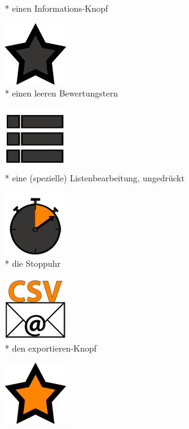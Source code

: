 \documentclass[FIPLY_base.tex]{subfiles}
\begin{document}
\begin{figure}[H]
\begin{subfigure}[b]{0.2\textwidth}
			\caption{* einen Informations-Knopf}
		\end{subfigure}
		\hfil
		\begin{subfigure}[b]{0.2\textwidth}
			\includegraphics[scale=0.4]{img/icons/star_emptysmall}
			\caption{* einen leeren Bewertungstern}
		\end{subfigure}
		\hfil
		\begin{subfigure}[b]{0.2\textwidth}
			\includegraphics[scale=0.4]{img/icons/listviewunpressed}
			\caption{* eine (spezielle) Listenbearbeitung, ungedrückt}
		\end{subfigure}
		\hfil
		\begin{subfigure}[b]{0.2\textwidth}
			\includegraphics[scale=0.4]{img/icons/stopwatch}
			\caption{* die Stoppuhr}
		\end{subfigure}
		\hfil
		\begin{subfigure}[b]{0.2\textwidth}
			\includegraphics[scale=0.4]{img/icons/exportcsvsmall}
			\caption{* den exportieren-Knopf}
		\end{subfigure}
		\hfil
		\begin{subfigure}[b]{0.2\textwidth}
			\includegraphics[scale=0.4]{img/icons/starsmall}

\end{subfigure}
\end{figure}
\end{document}
